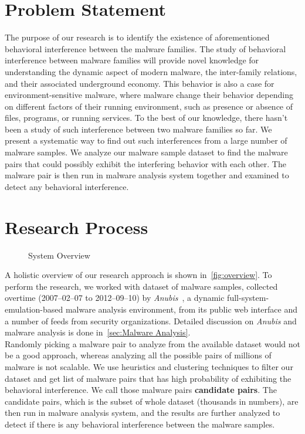 \section{Problem Statement}
\label{sec:Problem Statement}
The purpose of our research is to identify the existence of aforementioned behavioral interference between the malware families.
The study of behavioral interference between malware families will provide novel knowledge for understanding the dynamic aspect of modern malware, the inter-family relations, and their associated underground economy.
This behavior is also a case for environment-sensitive malware, where malware change their behavior depending on different factors of their running environment, such as presence or absence of files, programs, or running services.
To the best of our knowledge, there hasn't been a study of such interference between two malware families so far.
We present a systematic way to find out such interferences from a large number of malware samples.
We analyze our malware sample dataset to find the malware pairs that could possibly exhibit the interfering behavior with each other.
The malware pair is then run in malware analysis system together and examined to detect any behavioral interference.
\section{Research Process}
\label{sec:Research Process}

\begin{figure}[h]
    \centering
    \def\svgwidth{\columnwidth}
    \scalebox{0.7}{}
\caption{System Overview}
\label{fig:overview}
\end{figure}

A holistic overview of our research approach is shown in~\autoref{fig:overview}.
To perform the research, we worked with dataset of {\gettotalmalwarei{}} malware samples, collected overtime (2007--02--07 to 2012--09--10) by \emph{Anubis}~\cite[]{anubis}, a dynamic full-system-emulation-based malware analysis environment, from its public web interface and a number of feeds from security organizations.
Detailed discussion on \emph{Anubis} and malware analysis is done in~\autoref{sec:Malware Analysis}.\\

Randomly picking a malware pair to analyze from the available dataset would not be a good approach, whereas analyzing all the possible pairs of millions of malware is not scalable.
We use heuristics and clustering techniques to filter our dataset and get list of malware pairs that has high probability of exhibiting the behavioral interference.
We call those malware pairs \textbf{candidate pairs}.
The candidate pairs, which is the subset of whole dataset (thousands in numbers), are then run in malware analysis system, and the results are further analyzed to detect if there is any behavioral interference between the malware samples.\\

